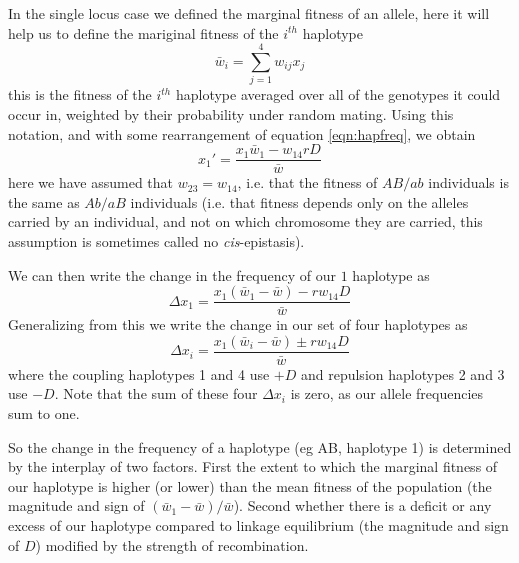 In the single locus case we defined the marginal fitness of an allele, here it will help us to define the mariginal fitness of the $i^{th}$ haplotype
\begin{equation}
\bar{w}_i = \sum_{j=1}^4 w_{ij} x_j
\end{equation}
this is the fitness of the $i^{th}$ haplotype averaged over all of the genotypes it could occur in, weighted by their probability under random mating. Using this notation, and with some rearrangement of equation \eqref{eqn:hapfreq}, we obtain
\begin{equation}
x_1' = \frac{x_1\bar{w}_1 - w_{14} r D}{\bar{w}}
\end{equation}
here we have assumed that $w_{23}=w_{14}$, i.e. that the fitness of $AB/ab$ individuals is the same as $Ab/aB$ individuals (i.e. that fitness depends only on the alleles carried by an individual, and not on which chromosome they are carried, this assumption is sometimes called no {\it cis}-epistasis). 

We can then write the change in the frequency of our $1$ haplotype as 
\begin{equation}
\Delta x_1= \frac{x_1(\bar{w}_1-\bar{w}) -r w_{14} D}{\bar{w}}
\end{equation}
Generalizing from this we write the change in our set of four haplotypes as
\begin{equation}
\Delta x_i= \frac{x_1(\bar{w}_i-\bar{w}) \pm r w_{14} D}{\bar{w}}
\end{equation}
where the coupling haplotypes 1 and 4 use $+D$ and repulsion haplotypes 2 and 3 use $-D$. Note that the sum of these four $\Delta x_i$ is zero, as our allele frequencies sum to one.

So the change in the frequency of a haplotype (eg AB, haplotype 1) is determined by the interplay of two factors. First the extent to which  the marginal fitness of our haplotype is higher (or lower) than the mean fitness of the population (the magnitude and sign of $(\bar{w}_1-\bar{w})/\bar{w}$). Second whether there is a deficit or any excess of our haplotype compared to linkage equilibrium (the magnitude and sign of $D$) modified by the strength of recombination. 

